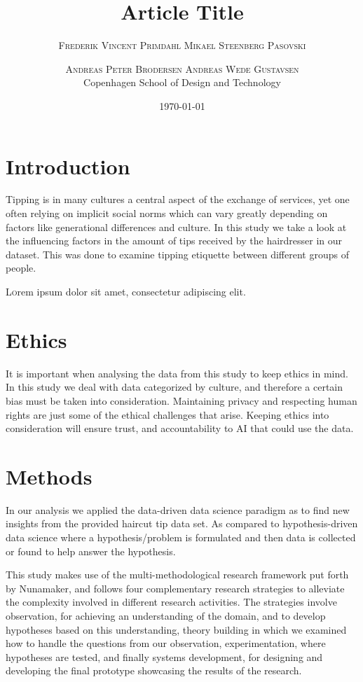\documentclass[twoside,twocolumn]{article}
\title{Article Title} %
\author{%
\textsc{Frederik Vincent Primdahl} \textsc{Mikael Steenberg Pasovski} \and \textsc{Andreas Peter Brodersen} \textsc{Andreas Wede Gustavsen}\\
\normalsize Copenhagen School of Design and Technology\\ %
}
\date{\today} %
\begin{document}
\maketitle


\section{Introduction}
Tipping is in many cultures a central aspect of the exchange of services, yet one often relying on implicit social norms which can vary greatly depending on factors like generational differences and culture. In this study we take a look at the influencing factors in the amount of tips received by the hairdresser in our dataset. This was done to examine tipping etiquette between different groups of people.

\lettrine[nindent=0em,lines=3]{L} orem ipsum dolor sit amet, consectetur adipiscing elit.

\section{Ethics} It is important when analysing the data from this study to keep ethics in mind. In this study we deal with data categorized by culture, and therefore a certain bias must be taken into consideration. Maintaining privacy and respecting human rights are just some of the ethical challenges that arise. Keeping ethics into consideration will ensure trust, and accountability to AI that could use the data.

\section{Methods}
In our analysis we applied the data-driven data science paradigm as to find new insights from the provided haircut tip data set.
As compared to hypothesis-driven data science where a hypothesis/problem is formulated and then data is collected or found to help answer the hypothesis.

This study makes use of the multi-methodological research framework put forth by Nunamaker, and follows four complementary research strategies to alleviate the complexity involved in different research activities. The strategies involve observation, for achieving an understanding of the domain, and to develop hypotheses based on this understanding, theory building in which we examined how to handle the questions from our observation, experimentation, where hypotheses are tested, and finally systems development, for designing and developing the final prototype showcasing the results of the research.
\end{document}
